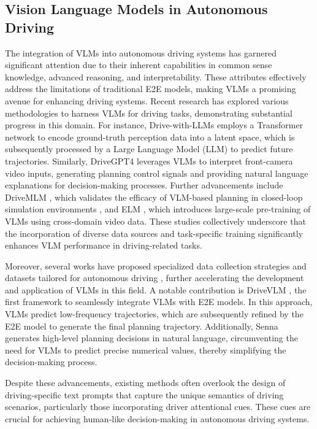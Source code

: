 \subsection{Vision Language Models in Autonomous Driving}
The integration of VLMs into autonomous driving systems has garnered significant attention due to their inherent capabilities in common sense knowledge, advanced reasoning, and interpretability. These attributes effectively address the limitations of traditional E2E models, making VLMs a promising avenue for enhancing driving systems. Recent research has explored various methodologies to harness VLMs for driving tasks, demonstrating substantial progress in this domain.
For instance, Drive-with-LLMs \cite{chen2024driving} employs a Transformer network to encode ground-truth perception data into a latent space, which is subsequently processed by a Large Language Model (LLM) to predict future trajectories. Similarly, DriveGPT4 \cite{xu2024drivegpt4} leverages VLMs to interpret front-camera video inputs, generating planning control signals and providing natural language explanations for decision-making processes. Further advancements include DriveMLM \cite{wang2023drivemlm}, which validates the efficacy of VLM-based planning in closed-loop simulation environments \cite{dosovitskiy2017carla}, and ELM \cite{zhou2024embodied}, which introduces large-scale pre-training of VLMs using cross-domain video data. These studies collectively underscore that the incorporation of diverse data sources and task-specific training significantly enhances VLM performance in driving-related tasks.

Moreover, several works have proposed specialized data collection strategies and datasets tailored for autonomous driving \cite{sima2024drivelm, qian2024nuscenes,wu2023referring,kim2018textual}, further accelerating the development and application of VLMs in this field. A notable contribution is DriveVLM \cite{tian2024drivevlm}, the first framework to seamlessly integrate VLMs with E2E models. In this approach, VLMs predict low-frequency trajectories, which are subsequently refined by the E2E model to generate the final planning trajectory. Additionally, Senna \cite{jiang2024senna} generates high-level planning decisions in natural language, circumventing the need for VLMs to predict precise numerical values, thereby simplifying the decision-making process.

Despite these advancements, existing methods often overlook the design of driving-specific text prompts that capture the unique semantics of driving scenarios, particularly those incorporating driver attentional cues. These cues are crucial for achieving human-like decision-making in autonomous driving systems.